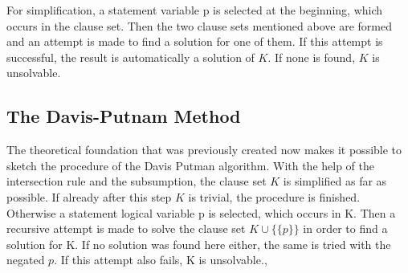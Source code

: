 For simplification, a statement variable p is selected at the beginning, which occurs in the clause set. Then the two clause sets mentioned above are formed and an attempt is made to find a solution for one of them. If this attempt is successful, the result is automatically a solution of $K$. If none is found, $K$ is unsolvable.

\subsection{The Davis-Putnam Method}
The theoretical foundation that was previously created now makes it possible to sketch the procedure of the Davis Putman algorithm. With the help of the intersection rule and the subsumption, the clause set $K$ is simplified as far as possible. If already after this step $K$ is trivial, the procedure is finished. Otherwise a statement logical variable p is selected, which occurs in K. Then a recursive attempt is made to solve the clause set $K \cup \bigl\{\{p\}\bigr\}$ in order to find a solution for K. If no solution was found here either, the same is tried with the negated $p$. If this attempt also fails, K is unsolvable.\cite{Zhang2000}, \cite{Stroetman2019}

